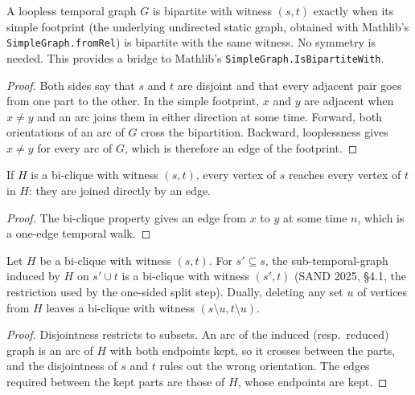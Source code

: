 \begin{lemma}
  \label{lem:is-bipartite-iff-footprint}
  \leanok
  A loopless temporal graph $G$ is bipartite with witness $(s, t)$ exactly
  when its simple footprint (the underlying undirected static graph, obtained
  with Mathlib's \texttt{SimpleGraph.fromRel}) is bipartite with the same
  witness. No symmetry is needed. This provides a bridge to Mathlib's
  \texttt{SimpleGraph.IsBipartiteWith}.
\end{lemma}

\begin{proof}
  \leanok
  Both sides say that $s$ and $t$ are disjoint and that every adjacent pair goes from one part to
  the other. In the simple footprint, $x$ and $y$ are adjacent when $x \ne y$ and an arc joins them
  in either direction at some time. Forward, both orientations of an arc of $G$ cross the
  bipartition. Backward, looplessness gives $x \ne y$ for every arc of $G$, which is therefore an
  edge of the footprint.
\end{proof}

\begin{lemma}
  \label{lem:reachable-of-isBicliqueWith}
  \leanok
  If $H$ is a bi-clique with witness $(s, t)$, every vertex of $s$ reaches
  every vertex of $t$ in $H$: they are joined directly by an edge.
\end{lemma}

\begin{proof}
  \leanok
  The bi-clique property gives an edge from $x$ to $y$ at some time $n$, which is a one-edge temporal walk.
\end{proof}

\begin{lemma}
  \label{lem:isBicliqueWith-induce-deleteVerts}
  \leanok
  Let $H$ be a bi-clique with witness $(s, t)$. For $s' \subseteq s$, the
  sub-temporal-graph induced by $H$ on $s' \cup t$ is a bi-clique with
  witness $(s', t)$ (SAND 2025, \S4.1, the restriction used by the one-sided
  split step). Dually, deleting any set $u$ of vertices from $H$ leaves a
  bi-clique with witness $(s \setminus u, t \setminus u)$.
\end{lemma}

\begin{proof}
  \leanok
  Disjointness restricts to subsets. An arc of the induced (resp.\ reduced) graph is an arc of $H$ with both endpoints kept, so it crosses between the parts, and the disjointness of $s$ and $t$ rules out the wrong orientation. The edges required between the kept parts are those of $H$, whose endpoints are kept.
\end{proof}
